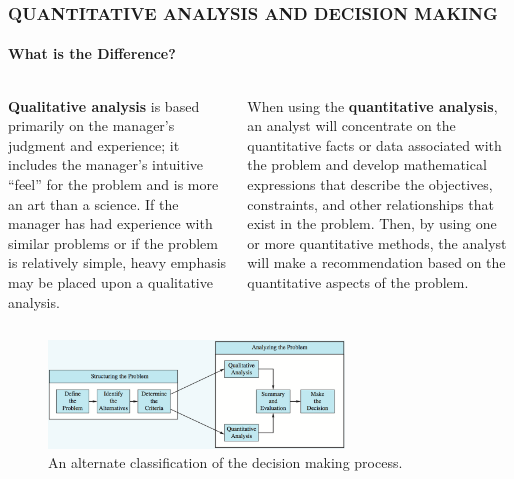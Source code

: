 \documentclass[14 pt]{beamer}
\begin{document}
\begin{frame}[t]
\frametitle{QUANTITATIVE ANALYSIS AND DECISION MAKING}
\framesubtitle{What is the Difference?}

\begin{columns}[t]
\begin{column}{0.45\textwidth}
\textbf{Qualitative analysis} is based primarily on the manager’s judgment and experience; it includes the manager’s intuitive “feel” for the problem and is more an art than a science. If the manager has had experience with similar problems or if the problem is relatively simple, heavy emphasis may be placed upon a qualitative analysis.
\end{column}

\begin{column}{0.45\textwidth}
When using the \textbf{quantitative analysis}, an analyst will concentrate on the quantitative facts or data associated with the problem and develop mathematical expressions that describe the objectives, constraints, and other relationships that exist in the problem. Then, by using one or more quantitative methods, the analyst will make a recommendation based on the quantitative aspects of the problem.
\end{column}
\end{columns}
\vskip1.5cm%
\begin{figure}[t]
\includegraphics[width=0.7\textwidth]{img/alternate-classification}
\caption{An alternate classification of the decision making process.}
\end{figure}

\end{frame}

\end{document}
